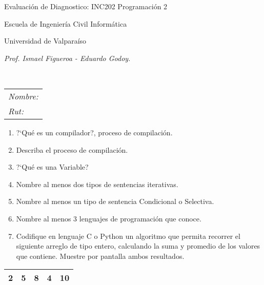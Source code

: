 \documentclass{article}
\begin{document}
	\centerline{\sc \large Evaluaci\'on de Diagnostico: INC202 Programaci\'on 2}
	\centerline{\sc \normalsize Escuela de Ingenier\'ia Civil Inform\'atica}
	\centerline{\sc \normalsize  Universidad de Valpara\'iso}
 \centerline\emph{\sc \small Prof. Ismael Figueroa - Eduardo Godoy.} \\


 \begin{tabular}{ l }

   \emph{\sc Nombre:}  \\
    \emph{\sc Rut:} \\

 \end{tabular}

	\vspace{1pc}

	\begin{enumerate}
		\item ?`Qu\'e es un compilador?, proceso de compilaci\'on.
		\item Describa el proceso de compilaci\'on.
		\item ?`Qu\'e es una Variable?
		\item Nombre al menos dos tipos de sentencias iterativas.
		\item Nombre al menos un tipo de sentencia Condicional o Selectiva.
		\item Nombre al menos 3 lenguajes de programaci\'on que conoce.
		\item Codifique en lenguaje C o Python un algoritmo que permita recorrer el siguiente arreglo de tipo entero,  calculando la suma y promedio de los valores que contiene. Muestre por pantalla ambos resultados.
\end{enumerate}

	\begin{table}[!ht]
	\centering
	\begin{tabular}{|l|l|l|l|l|}\hline
	2 & 5 &  8& 4 & 10 \\ \hline
\end{tabular}
	\end{table}
\end{document}
